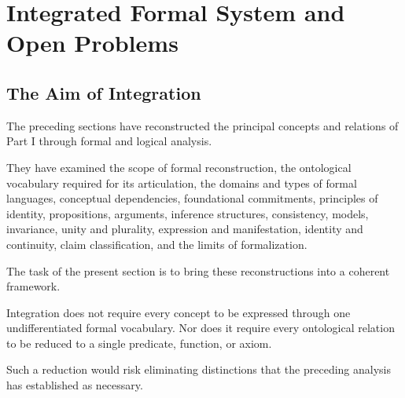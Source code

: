 %
%
%
%

\section{Integrated Formal System and Open Problems}
\label{sec:integrated-formal-system-and-open-problems}

\subsection{The Aim of Integration}

The preceding sections have reconstructed the principal
concepts and relations of Part I through formal and
logical analysis.

They have examined the scope of formal reconstruction,
the ontological vocabulary required for its articulation,
the domains and types of formal languages, conceptual
dependencies, foundational commitments, principles
of identity, propositions, arguments, inference structures,
consistency, models, invariance, unity and plurality,
expression and manifestation, identity and continuity,
claim classification, and the limits of formalization.

The task of the present section is to bring these
reconstructions into a coherent framework.

Integration does not require every concept to be
expressed through one undifferentiated formal vocabulary.
Nor does it require every ontological relation to be
reduced to a single predicate, function, or axiom.

Such a reduction would risk eliminating distinctions
that the preceding analysis has established as necessary.

